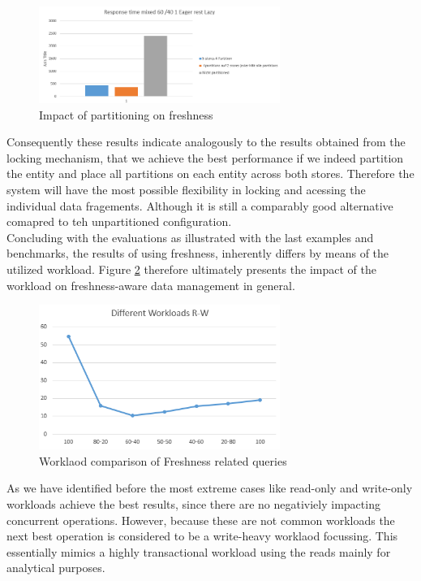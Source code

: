 \begin{figure}[t] 
    \centering 
    \includegraphics[width=0.7\textwidth]{Figures/partioned_freshness.PNG}
    \caption{Impact of partitioning on freshness}
    \label{fig:partition_result}
\end{figure}


Consequently these results indicate analogously to the results obtained from the locking mechanism, that we achieve the best performance
if we indeed partition the entity and place all partitions on each entity across both stores. Therefore the system will have the most possible 
flexibility in locking and acessing the individual data fragements. Although 
it is still a comparably good alternative comapred to teh unpartitioned configuration.\\



Concluding with the evaluations as illustrated with the last examples and benchmarks, the results of using freshness, inherently differs by means of the utilized workload.
Figure \ref{fig:workload_comp} therefore ultimately presents the impact of the workload on freshness-aware data management in general. 

\begin{figure}[t] 
    \centering 
    \includegraphics[width=0.7\textwidth]{Figures/different_ workloads.PNG}
    \caption{Worklaod comparison of Freshness related queries}
    \label{fig:workload_comp}
\end{figure}

As we have identified before the most extreme cases like read-only and write-only workloads achieve the best results,
since there are no negativiely impacting concurrent operations.
However, because these are not common workloads the next best operation is considered to be a write-heavy worklaod focussing.
This essentially mimics a highly transactional workload using the reads mainly for analytical purposes.


